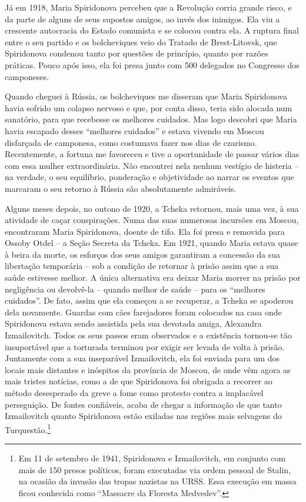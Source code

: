 Já em 1918, Maria Spiridonova percebeu que a Revolução corria grande
risco, e da parte de alguns de seus supostos amigos, ao invés dos
inimigos. Ela viu a crescente autocracia do Estado comunista e se
colocou contra ela. A ruptura final entre o seu partido e os
bolcheviques veio do Tratado de Brest-Litovsk, que Spiridonova condenou
tanto por questões de princípio, quanto por razões práticas. Pouco após
isso, ela foi presa junto com 500 delegados no Congresso dos camponeses.

Quando cheguei à Rússia, os bolcheviques me disseram que Maria
Spiridonova havia sofrido um colapso nervoso e que, por conta disso,
teria sido alocada num sanatório, para que recebesse os melhores
cuidados. Mas logo descobri que Maria havia escapado desses ``melhores
cuidados'' e estava vivendo em Moscou disfarçada de camponesa, como
costumava fazer nos dias de czarismo. Recentemente, a fortuna me
favoreceu e tive a oportunidade de passar vários dias com essa mulher
extraordinária. Não encontrei nela nenhum vestígio de histeria -- na
verdade, o seu equilíbrio, ponderação e objetividade ao narrar os
eventos que marcaram o seu retorno à Rússia são absolutamente
admiráveis.

Alguns meses depois, no outono de 1920, a Tcheka retornou, mais uma vez,
à sua atividade de caçar conspirações. Numa das suas numerosas incursões
em Moscou, encontraram Maria Spiridonova, doente de tifo. Ela foi presa
e removida para Ossoby Otdel -- a Seção Secreta da Tcheka. Em 1921,
quando Maria estava quase à beira da morte, os esforços dos seus amigos
garantiram a concessão da sua libertação temporária -- sob a condição de
retornar à prisão assim que a sua saúde estivesse melhor. A única
alternativa era deixar Maria morrer na prisão por negligência ou
devolvê-la -- quando melhor de saúde -- para os ``melhores cuidados''.
De fato, assim que ela começou a se recuperar, a Tcheka se apoderou dela
novamente. Guardas com cães farejadores foram colocados na casa onde
Spiridonova estava sendo assistida pela sua devotada amiga, Alexandra
Izmailovitch. Todos os seus passos eram observados e a existência
tornou-se tão insuportável que a torturada terminou por exigir ser
levada de volta à prisão. Juntamente com a sua inseparável Izmailovitch,
ela foi enviada para um dos locais mais distantes e inóspitos da
província de Moscou, de onde vêm agora as mais tristes notícias, como a
de que Spiridonova foi obrigada a recorrer ao método desesperado da
greve a fome como protesto contra a implacável perseguição. De fontes
confiáveis, ​​acaba de chegar a informação de que tanto Izmailovitch
quanto Spiridonova estão exiladas nas regiões mais selvagens do
Turquestão.\footnote{Em 11 de setembro de 1941, Spiridonova e
  Izmailovitch, em conjunto com mais de 150 presos políticos, foram
  executadas via ordem pessoal de Stalin, na ocasião da invasão das
  tropas nazistas na URSS. Essa execução em massa ficou conhecida como
  ``Massacre da Floresta Medvedev''.}


